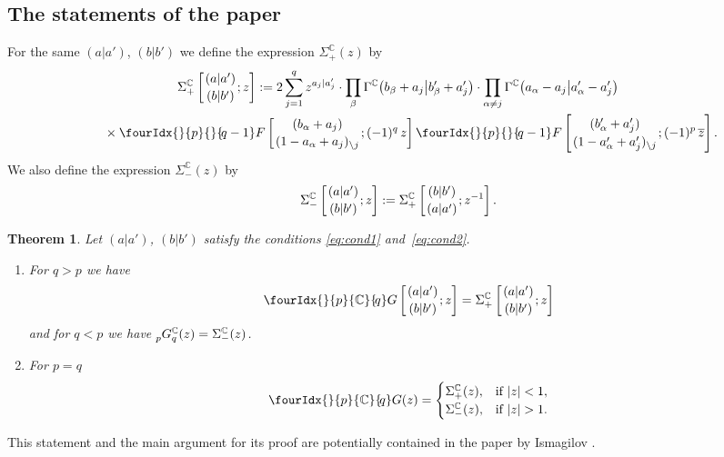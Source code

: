\documentclass[pdftex]{sigma}
\numberwithin{equation}{section}
\newtheorem{Theorem}{Theorem}[section]
\newcommand{\hyp}[2]{\fourIdx{}{#1}{}{\!#2}F}
\newcommand{\Gc}[2]{\fourIdx{}{#1}{\C}{\!#2}G}
\def\ov{\overline}
\def\C {{\mathbb C }}
\def\vp{^{\vphantom \C}}
\def\G{\vp G}
\begin{document}
\subsection{The statements of the paper}
For the same $(a|a')$, $(b|b')$ we define the expression
$\Sigma^\C_+(z)$ by
\begin{gather}
\Sigma^\C_+
\left[\genfrac{}{}{0pt}{}{(a|a')}{(b|b')};z\right]
:=2\sum_{j=1}^q z^{a_j|a_j'}\cdot \prod_{\beta}
\Gamma^\C\big(b_\beta+a_j\big|b_\beta'+a_j'\big)
\cdot \prod_{\alpha\ne j} \Gamma^\C\big(a_\alpha-a_j\big|a_\alpha'-a_j'\big) \nonumber\\
\qquad{}
\times
\hyp{p}{q-1}\left[\genfrac{}{}{0pt}{}{(b_\alpha+a_j)}
{(1-a_\alpha+a_j)_{\setminus j}};(-1)^q\,z\right]
\hyp{p}{q-1}\left[\genfrac{}{}{0pt}{}{(b_\alpha'+a_j')}
{(1-a_\alpha'+a_j')_{\setminus j}};(-1)^p\,\ov z\right].
 \label{eq:Xi}
\end{gather}
We also define the expression $\Sigma^\C_-(z)$ by
\[
\Sigma^\C_-
\left[\genfrac{}{}{0pt}{}{(a|a')}{(b|b')};z\right]
:=\Sigma^\C_+ \left[\genfrac{}{}{0pt}{}{(b|b')}{(a|a')};z^{-1}\right].
\]

\begin{Theorem}\label{th:1}
Let $(a|a')$, $(b|b')$ satisfy the conditions \eqref{eq:cond1} and~\eqref{eq:cond2}.
\begin{enumerate}\itemsep=0pt
\item[$(a)$] For $q>p$ we have
\[
\Gc{p}{q}\left[\genfrac{}{}{0pt}{}{(a|a')}{(b|b')};z\right]
=\Sigma^\C_+ \left[\genfrac{}{}{0pt}{}{(a|a')}{(b|b')};z\right]
\]
and for $q<p$ we have $_p\G^\C_q(z)=\Sigma^\C_-(z)$.
\item[$(b)$] For $p=q$
\[
\Gc{p}{q}(z)=
\begin{cases}
\Sigma^\C_+(z), & \text{if $|z|<1$}, \\
\Sigma^\C_-(z), & \text{if $|z|>1$}.
\end{cases}
\]
\end{enumerate}
\end{Theorem}

\begin{Remark} This statement and the main argument for its proof
are potentially contained in the paper by Ismagilov \cite[Lemma~2]{Ism2}.
\end{Remark}
\end{document}
